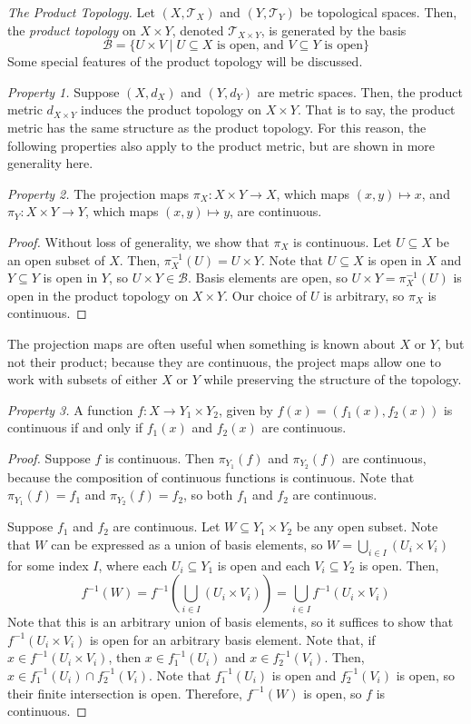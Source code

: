 \begin{framed}
\textit{The Product Topology.} Let $(X,\mathcal{T}_X)$ and $(Y,\mathcal{T}_Y)$ be topological spaces. Then, the \textit{product topology} on $X\times Y$, denoted $\mathcal{T}_{X\times Y}$, is generated by the basis \[\mathcal{B} = \{U\times V\mid U\subseteq X\text{ is open, and }V\subseteq Y\text{ is open}\}\] Some special features of the product topology will be discussed.

\textit{Property 1.} Suppose $(X, d_X)$ and $(Y,d_Y)$ are metric spaces. Then, the product metric $d_{X\times Y}$ induces the product topology on $X\times Y$. That is to say, the product metric has the same structure as the product topology. For this reason, the following properties also apply to the product metric, but are shown in more generality here.

\textit{Property 2.} The projection maps $\pi_X:X\times Y\to X$, which maps $(x,y)\mapsto x$, and $\pi_Y:X\times Y\to Y$, which maps $(x,y)\mapsto y$, are continuous. \begin{proof}
    Without loss of generality, we show that $\pi_X$ is continuous. Let $U\subseteq X$ be an open subset of $X$. Then, $\pi^{-1}_X(U) = U\times Y$. Note that $U\subseteq X$ is open in $X$ and $Y\subseteq Y$ is open in $Y$, so $U\times Y\in\mathcal{B}$. Basis elements are open, so $U\times Y=\pi_X^{-1}(U)$ is open in the product topology on $X\times Y$. Our choice of $U$ is arbitrary, so $\pi_X$ is continuous.
\end{proof} The projection maps are often useful when something is known about $X$ or $Y$, but not their product; because they are continuous, the project maps allow one to work with subsets of either $X$ or $Y$ while preserving the structure of the topology.

\textit{Property 3.} A function $f:X\to Y_1\times Y_2$, given by $f(x) = (f_1(x), f_2(x))$ is continuous if and only if $f_1(x)$ and $f_2(x)$ are continuous. \begin{proof}
    Suppose $f$ is continuous. Then $\pi_{Y_1}(f)$ and $\pi_{Y_2}(f)$ are continuous, because the composition of continuous functions is continuous. Note that $\pi_{Y_1}(f) = f_1$ and $\pi_{Y_2}(f)=f_2$, so both $f_1$ and $f_2$ are continuous.

    Suppose $f_1$ and $f_2$ are continuous. Let $W\subseteq Y_1\times Y_2$ be any open subset. Note that $W$ can be expressed as a union of basis elements, so $W=\displaystyle\bigcup_{i\in I} (U_i\times V_i)$ for some index $I$, where each $U_i\subseteq Y_1$ is open and each $V_i\subseteq Y_2$ is open. Then, \[f^{-1}(W) = f^{-1}\left(\displaystyle\bigcup_{i\in I} (U_i\times V_i)\right) = \displaystyle\bigcup_{i\in I} f^{-1}(U_i\times V_i)\] Note that this is an arbitrary union of basis elements, so it suffices to show that $f^{-1}(U_i\times V_i)$ is open for an arbitrary basis element. Note that, if $x\in f^{-1}(U_i\times V_i)$, then $x\in f_1^{-1}(U_i)$ and $x\in f_2^{-1}(V_i)$. Then, $x\in f_1^{-1}(U_i) \cap f_2^{-1}(V_i)$. Note that $f_1^{-1}(U_i)$ is open and $f_2^{-1}(V_i)$ is open, so their finite intersection is open. Therefore, $f^{-1}(W)$ is open, so $f$ is continuous.


\end{proof}
\end{framed}
